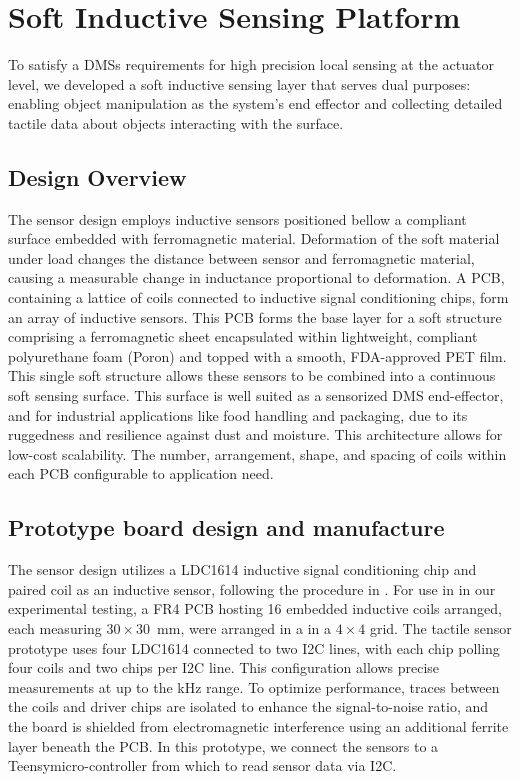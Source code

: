 \section{Soft Inductive Sensing Platform} %

To satisfy a \acp{DMS} requirements for high precision local sensing at the actuator level, we developed a soft inductive sensing layer that serves dual purposes: enabling object manipulation as the system's end effector and collecting detailed tactile data about objects interacting with the surface. 


\subsection{Design Overview}

The sensor design employs inductive sensors positioned bellow a compliant surface embedded with ferromagnetic material. Deformation of the soft material under load changes the distance between sensor and ferromagnetic material, causing a measurable change in inductance proportional to deformation.
A \ac{PCB}, containing a lattice of coils connected to inductive signal conditioning chips, form an array of inductive sensors. This \ac{PCB} forms the base layer for a soft structure comprising a ferromagnetic sheet encapsulated within lightweight, compliant polyurethane foam (Poron\textregistered) and topped with a smooth, FDA-approved \ac{PET} film. This single soft structure allows these sensors to be combined into a continuous soft sensing surface. This surface is well suited as a sensorized \ac{DMS} end-effector, and for industrial applications like food handling and packaging, due to its ruggedness and resilience against dust and moisture. 
This architecture allows for low-cost scalability. The number, arrangement, shape, and spacing of coils within each \ac{PCB} configurable to application need.





\subsection{Prototype board design and manufacture}

 The sensor design utilizes a LDC1614 inductive signal conditioning chip and paired coil as an inductive sensor, following the procedure in \cite{lo_preti_sensorized_2023}. For use in in our experimental testing, a FR4 \ac{PCB} hosting 16 embedded inductive coils arranged, each measuring $30 \times 30$~mm, were arranged in a in a $4 \times 4$ grid. The tactile sensor prototype uses four LDC1614 connected to two I2C lines, with each chip polling four coils and two chips per I2C line. This configuration allows precise measurements at up to the kHz range. To optimize performance, traces between the coils and driver chips are isolated to enhance the signal-to-noise ratio, and the board is shielded from electromagnetic interference using an additional ferrite layer beneath the \ac{PCB}. In this prototype, we connect the sensors to a Teensy\textregistered micro-controller from which to read sensor data via I2C.

